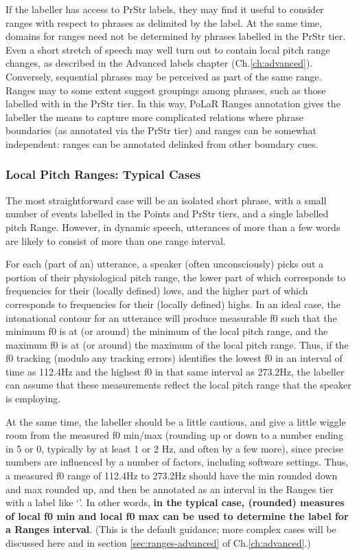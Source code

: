 \documentclass[11pt, twoside]{memoir}
\def\textlabel#1{{\relsize{-.5}\fontspec[Mapping=tex-text]{Roboto Mono}{#1}}}
\begin{document}
If the labeller has access to PrStr labels, they may find it useful to consider ranges with respect to phrases as delimited by the \textlabel{]} label. At the same time, domains for ranges need not be determined by phrases labelled in the PrStr tier. Even a short stretch of speech may well turn out to contain local pitch range changes, as described in the Advanced labels chapter (Ch.\ref{ch:advanced}). Conversely, sequential phrases may be perceived as part of the same range. Ranges may to some extent suggest groupings among phrases, such as those labelled with \textlabel{]} in the PrStr tier. In this way, PoLaR Ranges annotation gives the labeller the means to capture more complicated relations where phrase boundaries (as annotated via the PrStr tier) and ranges can be somewhat independent: ranges can be annotated delinked from other boundary cues.

\subsubsection{Local Pitch Ranges: Typical Cases}\label{sec:local-pitch-ranges-typical-cases}

The most straightforward case will be an isolated short phrase, with a small number of events labelled in the Points and PrStr tiers, and a single labelled pitch Range. However, in dynamic speech, utterances of more than a few words are likely to consist of more than one range interval.

For each (part of an) utterance, a speaker (often unconsciously) picks out a portion of their physiological pitch range, the lower part of which corresponds to frequencies for their (locally defined) lows, and the higher part of which corresponds to frequencies for their (locally defined) highs. In an ideal case, the intonational contour for an utterance will produce measurable f0 such that the minimum f0 is at (or around) the minimum of the local pitch range, and the maximum f0 is at (or around) the maximum of the local pitch range. Thus, if the f0 tracking (modulo any tracking errors) identifies the lowest f0 in an interval of time as 112.4Hz and the highest f0 in that same interval as 273.2Hz, the labeller can assume that these measurements reflect the local pitch range that the speaker is employing.

At the same time, the labeller should be a little cautious, and give a little wiggle room from the measured f0 min\slash max (rounding up or down to a number ending in 5 or 0, typically by at least 1 or 2 Hz, and often by a few more), since precise numbers are influenced by a number of factors, including software settings. Thus, a measured f0 range of 112.4Hz to 273.2Hz should have the min rounded down and max rounded up, and then be annotated as an interval in the Ranges tier with a label like ‘\textlabel{110-280}’. In other words, \textbf{in the typical case, (rounded) measures of local f0 min and local f0 max can be used to determine the label for a Ranges interval}. (This is the default guidance; more complex cases will be discussed here and in section \ref{sec:ranges-advanced} of Ch.\ref{ch:advanced}.)
\end{document}
